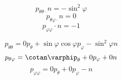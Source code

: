 $$p_{\theta\theta\cdot} n = -\sin^2\varphi$$ 
$$p_{\theta\varphi\cdot} n= 0$$ 
$$p_{\varphi\varphi} \cdot n = -1$$ 

$$p_{\theta\theta} = 0p_{\theta} + \sin\varphi\cos\varphi p_{\varphi} -\sin^2\varphi n$$ 
$$p_{\theta\varphi} = \cotan\varphip_{\theta} + 0p_{\varphi} + 0n$$ 
$$p_{\varphi\varphi} = 0p_{\theta} + 0p_{\varphi} -n$$ 


